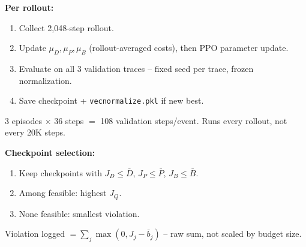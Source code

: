 \documentclass[aspectratio=169]{beamer}
\newcommand{\Dbar}{\bar D}
\newcommand{\Pbar}{\bar P}
\newcommand{\Bbar}{\bar B}
\begin{document}
\begin{frame}
\textbf{Per rollout:}
\begin{enumerate}
  \item Collect 2{,}048-step rollout.
  \item Update $\mu_D,\mu_P,\mu_B$ (rollout-averaged costs), then PPO parameter update.
  \item Evaluate on all 3 validation traces -- fixed seed per trace, frozen normalization.
  \item Save checkpoint + \texttt{vecnormalize.pkl} if new best.
\end{enumerate}

\vspace{8pt}
3 episodes $\times$ 36 steps $=$ 108 validation steps/event. Runs every rollout, not every 20K steps.

\vspace{8pt}
\textbf{Checkpoint selection:}
\begin{enumerate}
  \item Keep checkpoints with $J_D\le\Dbar$, $J_P\le\Pbar$, $J_B\le\Bbar$.
  \item Among feasible: highest $J_Q$.
  \item None feasible: smallest violation.
\end{enumerate}

\vspace{8pt}
\footnotesize Violation logged $=\sum_j\max(0,J_j-\bar b_j)$ -- raw sum, not scaled by budget size.
\end{frame}
\end{document}

